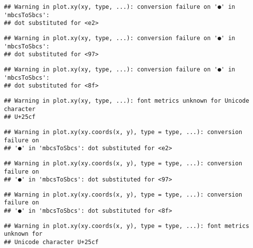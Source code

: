 \documentclass[
]{article}
\newenvironment{Shaded}{\begin{snugshade}}{\end{snugshade}}
\newcommand{\AttributeTok}[1]{\textcolor[rgb]{0.77,0.63,0.00}{#1}}
\newcommand{\FunctionTok}[1]{\textcolor[rgb]{0.00,0.00,0.00}{#1}}
\newcommand{\NormalTok}[1]{#1}
\newcommand{\SpecialCharTok}[1]{\textcolor[rgb]{0.00,0.00,0.00}{#1}}
\newcommand{\StringTok}[1]{\textcolor[rgb]{0.31,0.60,0.02}{#1}}
\begin{document}
\begin{verbatim}
## Warning in plot.xy(xy, type, ...): conversion failure on '●' in 'mbcsToSbcs':
## dot substituted for <e2>
\end{verbatim}

\begin{verbatim}
## Warning in plot.xy(xy, type, ...): conversion failure on '●' in 'mbcsToSbcs':
## dot substituted for <97>
\end{verbatim}

\begin{verbatim}
## Warning in plot.xy(xy, type, ...): conversion failure on '●' in 'mbcsToSbcs':
## dot substituted for <8f>
\end{verbatim}

\begin{verbatim}
## Warning in plot.xy(xy, type, ...): font metrics unknown for Unicode character
## U+25cf
\end{verbatim}

\begin{Shaded}
\end{Shaded}

\begin{verbatim}
## Warning in plot.xy(xy.coords(x, y), type = type, ...): conversion failure on
## '●' in 'mbcsToSbcs': dot substituted for <e2>
\end{verbatim}

\begin{verbatim}
## Warning in plot.xy(xy.coords(x, y), type = type, ...): conversion failure on
## '●' in 'mbcsToSbcs': dot substituted for <97>
\end{verbatim}

\begin{verbatim}
## Warning in plot.xy(xy.coords(x, y), type = type, ...): conversion failure on
## '●' in 'mbcsToSbcs': dot substituted for <8f>
\end{verbatim}

\begin{verbatim}
## Warning in plot.xy(xy.coords(x, y), type = type, ...): font metrics unknown for
## Unicode character U+25cf
\end{verbatim}
\end{document}
